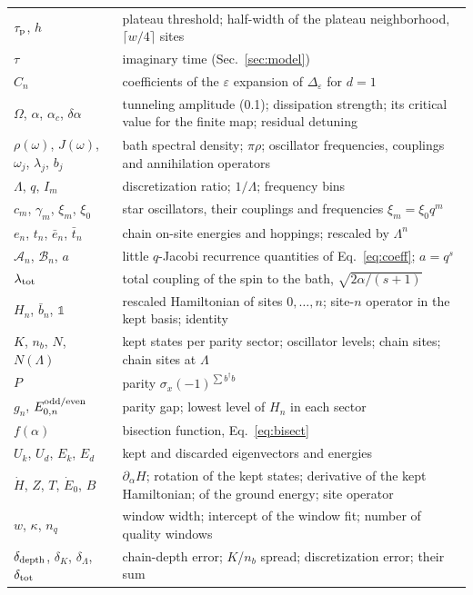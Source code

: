 \documentclass[10pt,a4paper]{article}
\newcommand{\De}{\Delta_\varepsilon}
\newcommand{\dd}{\delta_{\rm depth}}
\newcommand{\dK}{\delta_K}
\newcommand{\dL}{\delta_\Lambda}
\newcommand{\dtot}{\delta_{\rm tot}}
\newcommand{\nq}{n_q}
\newcommand{\one}{\mathds{1}}
\begin{document}
\begin{longtable}{@{}>{\raggedright\arraybackslash}p{3.4cm}p{12.2cm}@{}}
$\tau_{\rm p}$, $h$ & plateau threshold; half-width of the plateau neighborhood, $\lceil w/4\rceil$ sites\\
$\tau$ & imaginary time (Sec.~\ref{sec:model})\\
$C_n$ & coefficients of the $\varepsilon$ expansion of $\De$ for $d=1$\\
$\Omega$, $\alpha$, $\alpha_c$, $\delta\alpha$ & tunneling amplitude (0.1); dissipation strength; its critical value for the finite map; residual detuning\\
$\rho(\omega)$, $J(\omega)$, $\omega_j$, $\lambda_j$, $b_j$ & bath spectral density; $\pi\rho$; oscillator frequencies, couplings and annihilation operators\\
$\Lambda$, $q$, $I_m$ & discretization ratio; $1/\Lambda$; frequency bins\\
$c_m$, $\gamma_m$, $\xi_m$, $\xi_0$ & star oscillators, their couplings and frequencies $\xi_m=\xi_0q^m$\\
$e_n$, $t_n$, $\bar e_n$, $\bar t_n$ & chain on-site energies and hoppings; rescaled by $\Lambda^n$\\
$\mathcal A_n$, $\mathcal B_n$, $a$ & little $q$-Jacobi recurrence quantities of Eq.~\eqref{eq:coeff}; $a=q^s$\\
$\lambda_{\rm tot}$ & total coupling of the spin to the bath, $\sqrt{2\alpha/(s+1)}$\\
$H_n$, $\bar b_n$, $\one$ & rescaled Hamiltonian of sites $0,\dots,n$; site-$n$ operator in the kept basis; identity\\
$K$, $n_b$, $N$, $N(\Lambda)$ & kept states per parity sector; oscillator levels; chain sites; chain sites at $\Lambda$\\
$P$ & parity $\sigma_x(-1)^{\sum b^\dagger b}$\\
$g_n$, $E^{\rm odd/even}_{0,n}$ & parity gap; lowest level of $H_n$ in each sector\\
$f(\alpha)$ & bisection function, Eq.~\eqref{eq:bisect}\\
$U_k$, $U_d$, $E_k$, $E_d$ & kept and discarded eigenvectors and energies\\
$\dot H$, $Z$, $T$, $\dot E_0$, $B$ & $\partial_\alpha H$; rotation of the kept states; derivative of the kept Hamiltonian; of the ground energy; site operator\\
$w$, $\kappa$, $\nq$ & window width; intercept of the window fit; number of quality windows\\
$\dd$, $\dK$, $\dL$, $\dtot$ & chain-depth error; $K$/$n_b$ spread; discretization error; their sum\\

\end{longtable}
\end{document}
